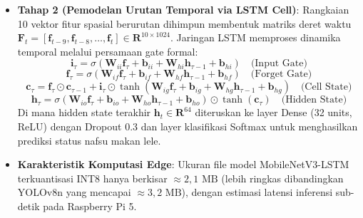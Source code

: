 \documentclass[10pt,a4paper]{article}
\providecommand{\text}[1]{\mbox{#1}}
\begin{document}
\begin{itemize}
    \item \textbf{Tahap 2 (Pemodelan Urutan Temporal via LSTM Cell)}:
    Rangkaian 10 vektor fitur spasial berurutan dihimpun membentuk matriks deret waktu $\mathbf{F}_t = [\mathbf{f}_{t-9}, \mathbf{f}_{t-8}, \dots, \mathbf{f}_t] \in \mathbf{R}^{10 \times 1024}$. Jaringan LSTM memproses dinamika temporal melalui persamaan gate formal:
    \begin{equation}
        \mathbf{i}_\tau = \sigma(\mathbf{W}_{ii} \mathbf{f}_\tau + \mathbf{b}_{ii} + \mathbf{W}_{hi} \mathbf{h}_{\tau-1} + \mathbf{b}_{hi}) \quad \text{(Input Gate)}
    \end{equation}
    \begin{equation}
        \mathbf{f}_\tau = \sigma(\mathbf{W}_{if} \mathbf{f}_\tau + \mathbf{b}_{if} + \mathbf{W}_{hf} \mathbf{h}_{\tau-1} + \mathbf{b}_{hf}) \quad \text{(Forget Gate)}
    \end{equation}
    \begin{equation}
        \mathbf{c}_\tau = \mathbf{f}_\tau \odot \mathbf{c}_{\tau-1} + \mathbf{i}_\tau \odot \tanh(\mathbf{W}_{ig} \mathbf{f}_\tau + \mathbf{b}_{ig} + \mathbf{W}_{hg} \mathbf{h}_{\tau-1} + \mathbf{b}_{hg}) \quad \text{(Cell State)}
    \end{equation}
    \begin{equation}
        \mathbf{h}_\tau = \sigma(\mathbf{W}_{io} \mathbf{f}_\tau + \mathbf{b}_{io} + \mathbf{W}_{ho} \mathbf{h}_{\tau-1} + \mathbf{b}_{ho}) \odot \tanh(\mathbf{c}_\tau) \quad \text{(Hidden State)}
    \end{equation}
    Di mana hidden state terakhir $\mathbf{h}_t \in \mathbf{R}^{64}$ diteruskan ke layer Dense (32 units, ReLU) dengan Dropout 0.3 dan layer klasifikasi Softmax untuk menghasilkan prediksi status nafsu makan lele.
    
    \item \textbf{Karakteristik Komputasi Edge}:
    Ukuran file model MobileNetV3-LSTM terkuantisasi INT8 hanya berkisar $\approx 2{,}1\text{ MB}$ (lebih ringkas dibandingkan YOLOv8n yang mencapai $\approx 3{,}2\text{ MB}$), dengan estimasi latensi inferensi sub-detik pada Raspberry Pi 5.
\end{itemize}

\vspace{0.2cm}
\end{document}
